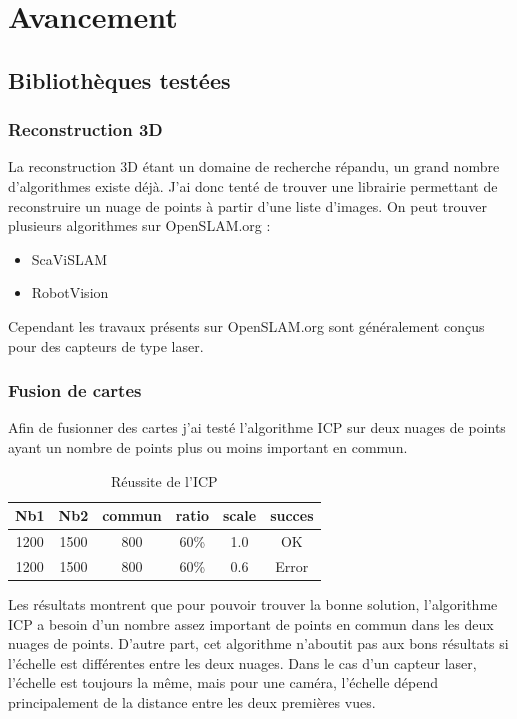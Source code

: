 \section{Avancement}

\subsection{Bibliothèques testées}

\subsubsection{Reconstruction 3D}

La reconstruction 3D étant un domaine de recherche répandu, un grand nombre d'algorithmes existe déjà. J'ai donc tenté de trouver une librairie permettant de reconstruire un nuage de points à partir d'une liste d'images.
On peut trouver plusieurs algorithmes sur OpenSLAM.org :
\begin{itemize}
  \item ScaViSLAM
  \item RobotVision
\end{itemize}

Cependant les travaux présents sur OpenSLAM.org sont généralement conçus pour des capteurs de type laser.

\subsubsection{Fusion de cartes}

Afin de fusionner des cartes j'ai testé l'algorithme ICP sur deux nuages de points ayant un nombre de points plus ou moins important en commun.

\begin{table}[h]
  \begin{center}
    \begin{tabular}{|c|c|c|c|c|c|}
    \hline
    Nb1 & Nb2 & commun & ratio & scale & succes \\
    \hline
    1200 & 1500 & 800 & 60\% & 1.0 & OK \\
    1200 & 1500 & 800 & 60\% & 0.6 & Error \\
    \hline
    \end{tabular}
  \caption{Réussite de l'ICP}
  \end{center}
\end{table}
Les résultats montrent que pour pouvoir trouver la bonne solution, l'algorithme ICP a besoin d'un nombre assez important de points en commun dans les deux nuages de points.
D'autre part, cet algorithme n'aboutit pas aux bons résultats si l'échelle est différentes entre les deux nuages.
Dans le cas d'un capteur laser, l'échelle est toujours la même, mais pour une caméra, l'échelle dépend principalement de la distance entre les deux premières vues.

